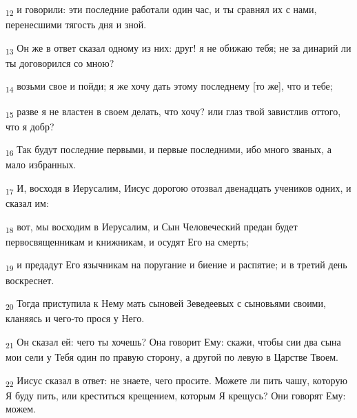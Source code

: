 \begin{tcolorbox}
\textsubscript{12} и говорили: эти последние работали один час, и ты сравнял их с нами, перенесшими тягость дня и зной.
\end{tcolorbox}
\begin{tcolorbox}
\textsubscript{13} Он же в ответ сказал одному из них: друг! я не обижаю тебя; не за динарий ли ты договорился со мною?
\end{tcolorbox}
\begin{tcolorbox}
\textsubscript{14} возьми свое и пойди; я же хочу дать этому последнему [то же], что и тебе;
\end{tcolorbox}
\begin{tcolorbox}
\textsubscript{15} разве я не властен в своем делать, что хочу? или глаз твой завистлив оттого, что я добр?
\end{tcolorbox}
\begin{tcolorbox}
\textsubscript{16} Так будут последние первыми, и первые последними, ибо много званых, а мало избранных.
\end{tcolorbox}
\begin{tcolorbox}
\textsubscript{17} И, восходя в Иерусалим, Иисус дорогою отозвал двенадцать учеников одних, и сказал им:
\end{tcolorbox}
\begin{tcolorbox}
\textsubscript{18} вот, мы восходим в Иерусалим, и Сын Человеческий предан будет первосвященникам и книжникам, и осудят Его на смерть;
\end{tcolorbox}
\begin{tcolorbox}
\textsubscript{19} и предадут Его язычникам на поругание и биение и распятие; и в третий день воскреснет.
\end{tcolorbox}
\begin{tcolorbox}
\textsubscript{20} Тогда приступила к Нему мать сыновей Зеведеевых с сыновьями своими, кланяясь и чего-то прося у Него.
\end{tcolorbox}
\begin{tcolorbox}
\textsubscript{21} Он сказал ей: чего ты хочешь? Она говорит Ему: скажи, чтобы сии два сына мои сели у Тебя один по правую сторону, а другой по левую в Царстве Твоем.
\end{tcolorbox}
\begin{tcolorbox}
\textsubscript{22} Иисус сказал в ответ: не знаете, чего просите. Можете ли пить чашу, которую Я буду пить, или креститься крещением, которым Я крещусь? Они говорят Ему: можем.
\end{tcolorbox}
